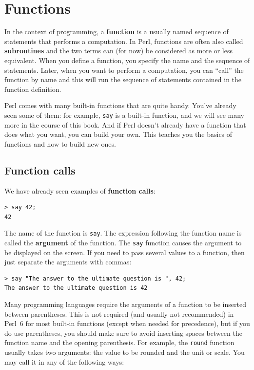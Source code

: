 \chapter{Functions}
\label{funcchap}

In the context of programming, a {\bf function} 
is a usually named sequence of statements 
that performs a computation.  In Perl, functions are often 
also called {\bf subroutines} and the two terms can (for now) 
be considered as more or less equivalent. When you define 
a function, you specify the name and the sequence of statements.  
Later, when you want to perform a computation, you can ``call'' 
the function by name and this will run the sequence of statements 
contained in the function definition.

Perl comes with many built-in functions that are quite handy.  
You've already seen some of them: for example, {\tt say} is a 
built-in function, and we will see many more in the course of 
this book. And if Perl doesn't already have a function that does 
what you want, you can build your own. This teaches you the basics 
of functions and how to build new ones.

\section{Function calls}
\label{functionchap}

We have already seen examples of {\bf function calls}:

\begin{verbatim}
> say 42;
42
\end{verbatim}
%
The name of the function is {\tt say}.  The expression following 
the function name is called the {\bf argument} of the function. 
The {\tt say} function causes the argument to be displayed 
on the screen. If you need to pass several values to a function, 
then just separate the arguments with commas:
\begin{verbatim}
> say "The answer to the ultimate question is ", 42;
The answer to the ultimate question is 42
\end{verbatim}
%

Many programming languages require the arguments of a function to 
be inserted between parentheses. This is not required (and 
usually not recommended) in Perl~6 for most built-in functions 
(except when needed for precedence), but if you do use 
parentheses, you should make sure to avoid inserting spaces 
between the function name and the opening parenthesis. 
For example, the {\tt round} function usually takes two 
arguments: the value to be rounded and the unit or scale. 
You may call it in any of the following ways:

